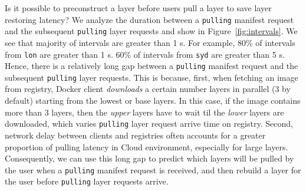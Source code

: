 %
%
%
%
%
%

%
Is it possible to 
preconstruct a layer before users pull a layer to save layer restoring latency?
We analyze the duration between a \texttt{pulling} manifest request and the subsequent \texttt{pulling} layer requests
and show in Figure~\ref{fig:intervals}.
We see that 
majority of intervals are greater than 1 s.
For example, 80\% of intervals from \texttt{lon} are greater than 1 s.
60\% of intervals from \texttt{syd} are greater than 5 s.
Hence,
there is a relatively long gap between a \texttt{pulling} manifest request and the subsequent \texttt{pulling} layer requests.
This is because, first,
when fetching an image from registry,
Docker client \emph{downloads} a certain number layers in parallel (3 by default)
starting from the lowest or base layers.
In this case, if the image contains more than 3 layers, then the \emph{upper} layers have to 
wait til the \emph{lower} layers are downloaded, which varies
\texttt{pulling} layer request arrive time on registry.
Second, network delay between clients and registries 
often accounts for a greater proportion of pulling latency in Cloud environment, especially for
large layers.
Consequently,
we can use this long gap to predict which layers will be pulled by the user
when a \texttt{pulling} manifest request is received,
 and then 
rebuild a layer for the user before \texttt{pulling} layer requests arrive.

